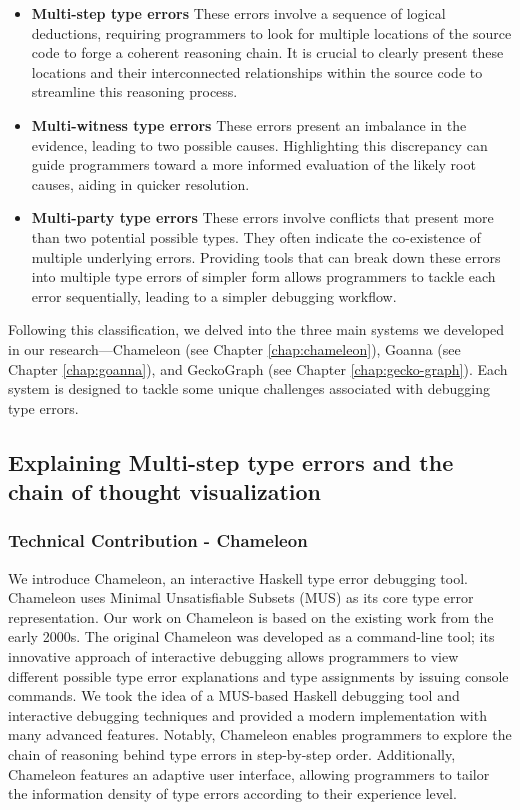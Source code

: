 \begin{itemize}
    \item {\textbf{Multi-step type errors} These errors involve a sequence of logical deductions, requiring programmers to look for multiple locations of the source code to forge a coherent reasoning chain. It is crucial to clearly present these locations and their interconnected relationships within the source code to streamline this reasoning process.}
    \item{\textbf{Multi-witness type errors}  These errors present an imbalance in the evidence, leading to two possible causes. Highlighting this discrepancy can guide programmers toward a more informed evaluation of the likely root causes, aiding in quicker resolution.}
    \item{\textbf{Multi-party type errors} These errors involve conflicts that present more than two potential possible types. They often indicate the co-existence of multiple underlying errors. Providing tools that can break down these errors into multiple type errors of simpler form allows programmers to tackle each error sequentially, leading to a simpler debugging workflow.}
\end{itemize}


Following this classification, we delved into the three main systems we developed in our research—Chameleon (see Chapter \ref{chap:chameleon}), Goanna (see Chapter \ref{chap:goanna}), and GeckoGraph (see Chapter \ref{chap:gecko-graph}). Each system is designed to tackle some unique challenges associated with debugging type errors.

\subsection{Explaining Multi-step type errors and the chain of thought visualization}

\subsubsection{Technical Contribution - Chameleon}

We introduce Chameleon, an interactive Haskell type error debugging tool. Chameleon uses Minimal Unsatisfiable Subsets (MUS) as its core type error representation. Our work on Chameleon is based on the existing work \cite{Stuckey2003-pz, Wazny2006-ll} from the early 2000s. The original Chameleon was developed as a command-line tool; its innovative approach of interactive debugging allows programmers to view different possible type error explanations and type assignments by issuing console commands.  We took the idea of a MUS-based Haskell debugging tool and interactive debugging techniques and provided a modern implementation with many advanced features. Notably, Chameleon enables programmers to explore the chain of reasoning behind type errors in step-by-step order. Additionally, Chameleon features an adaptive user interface, allowing programmers to tailor the information density of type errors according to their experience level.


